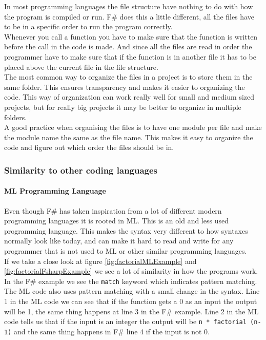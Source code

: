 \documentclass[12pt, a4paper]{article}
\newcommand{\code}[1]{{\small \texttt{#1}}}
\begin{document}
In most programming languages the file structure have nothing to do with how the program is compiled or run. F\# does this a little different, all the files have to be in a specific order to run the program correctly.\\

Whenever you call a function you have to make sure that the function is written before the call in the code is made. And since all the files are read in order the programmer have to make sure that if the function is in another file it has to be placed above the current file in the file structure.\\

The most common way to organize the files in a project is to store them in the same folder. This ensures transparency and makes it easier to organizing the code. This way of organization can work really well for small and medium sized projects, but for really big projects it may be better to organize in multiple folders.\\

A good practice when organising the files is to have one module per file and make the module name the same as the file name. This makes it easy to organize the code and figure out which order the files should be in.\\

\newpage
\subsubsection{Similarity to other coding languages}

\paragraph{ML Programming Language}

Even though F\# has taken inspiration from a lot of different modern programming languages it is rooted in ML. This is an old and less used programming language. This makes the syntax very different to how syntaxes normally look like today, and can make it hard to read and write for any programmer that is not used to ML or other similar programming languages.\\

If we take a close look at figure \ref{fig:factorialMLExample} and \ref{fig:factorialFsharpExample} we see a lot of similarity in how the programs work. In the F\# example we see the \code{match} keyword which indicates pattern matching. The ML code also uses pattern matching with a small change in the syntax. Line 1 in the ML code we can see that if the function gets a 0 as an input the output will be 1, the same thing happens at line 3 in the F\# example. Line 2 in the ML code tells us that if the input is an integer the output will be \code{n * factorial (n-1)} and the same thing happens in F\# line 4 if the input is not 0.\\
\end{document}
